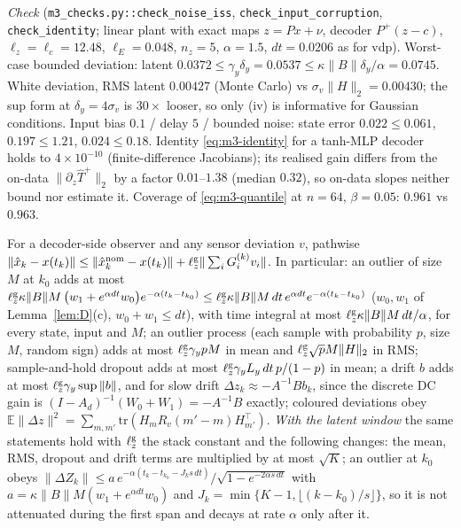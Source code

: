 \emph{Check} (\texttt{m3\_checks.py::check\_noise\_iss}, \texttt{check\_input\_corruption},
\texttt{check\_identity}; linear plant with exact maps $z=Px+\nu$, decoder $P^{+}(z-c)$,
$\ell_z=\ell_c=12.48$, $\ell_E=0.048$, $n_z=5$, $\alpha=1.5$, $dt=0.0206$ as for vdp).
Worst-case bounded deviation: latent $0.0372\le\gamma_y\delta_y=0.0537\le\kappa\|B\|\delta_y/\alpha=0.0745$.
White deviation, RMS latent $0.00427$ (Monte Carlo) vs $\sigma_v\|H\|_2=0.00430$; the sup form at
$\delta_y=4\sigma_v$ is $30\times$ looser, so only (iv) is informative for Gaussian conditions. Input
bias $0.1$ / delay $5$ / bounded noise: state error $0.022\le0.061$, $0.197\le1.21$, $0.024\le0.18$.
Identity \eqref{eq:m3-identity} for a tanh-MLP decoder holds to $4\times10^{-10}$ (finite-difference Jacobians); its realised gain differs from the on-data
$\|\partial_z\hat T^{+}\|_2$ by a factor $0.01$--$1.38$ (median $0.32$), so on-data slopes neither
bound nor estimate it. Coverage of \eqref{eq:m3-quantile} at $n=64$, $\beta=0.05$: $0.961$ vs $0.963$.

\begin{corollary}\label{cor:m3-faults}
 For a decoder-side observer and any sensor deviation $v$, pathwise
$\|\hat x_k-x(t_k)\|\le\|\hat x^{\rm nom}_k-x(t_k)\|+\ell^{\rm g}_z\|\sum_iG^{(k)}_iv_i\|$. In particular:
an outlier of size $M$ at $k_0$ adds at most
$\ell^{\rm g}_z\kappa\|B\|M\,\big(w_1+e^{\alpha dt}w_0\big)e^{-\alpha(t_k-t_{k_0})}\le\ell^{\rm g}_z\kappa\|B\|M\,dt\,e^{\alpha dt}e^{-\alpha(t_k-t_{k_0})}$
($w_0,w_1$ of Lemma~\ref{lem:D}(c), $w_0+w_1\le dt$), with time integral at most
$\ell^{\rm g}_z\kappa\|B\|M\,dt/\alpha$, for every state, input and $M$; an outlier process (each
sample with probability $p$, size $M$, random sign) adds at most $\ell^{\rm g}_z\gamma_ypM$ in mean and
$\ell^{\rm g}_z\sqrt pM\|H\|_2$ in RMS; sample-and-hold dropout adds at most
$\ell^{\rm g}_z\gamma_yL_y\,dt\,p/(1-p)$ in mean; a drift $b$ adds at most $\ell^{\rm g}_z\gamma_y\sup\|b\|$,
and for slow drift $\Delta z_k\approx-A^{-1}Bb_k$, since the discrete DC gain is
$(I-A_d)^{-1}(W_0+W_1)=-A^{-1}B$ exactly; coloured deviations obey
$\mathbb E\|\Delta z\|^2=\sum_{m,m'}\mathrm{tr}(H_mR_v(m'-m)H_{m'}^\top)$.
\emph{With the latent window} the same statements hold with $\ell^{\rm g}_z$ the stack constant and the following
changes: the mean, RMS, dropout and drift terms are multiplied by at most $\sqrt K$; an outlier at $k_0$ obeys
$\|\Delta Z_k\|\le a\,e^{-\alpha(t_k-t_{k_0}-J_ks\,dt)}/\sqrt{1-e^{-2\alpha s\,dt}}$ with
$a=\kappa\|B\|M(w_1+e^{\alpha dt}w_0)$ and $J_k=\min\{K-1,\lfloor(k-k_0)/s\rfloor\}$, so it is not attenuated during the
first span and decays at rate $\alpha$ only after it.
\end{corollary}

